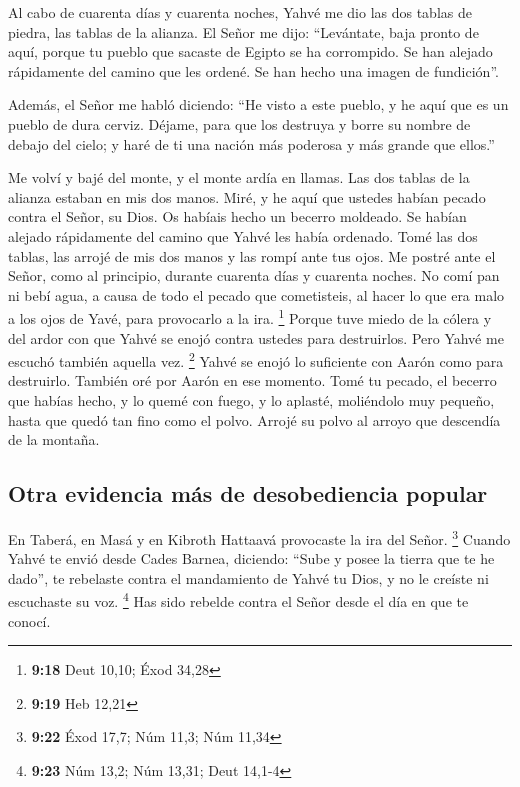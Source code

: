  Al cabo de cuarenta días y cuarenta noches, Yahvé me dio
las dos tablas de piedra, las tablas de la alianza.  El
Señor me dijo: ``Levántate, baja pronto de aquí, porque tu pueblo que
sacaste de Egipto se ha corrompido. Se han alejado rápidamente del
camino que les ordené. Se han hecho una imagen de fundición''.

 Además, el Señor me habló diciendo: ``He visto a este
pueblo, y he aquí que es un pueblo de dura cerviz. 
Déjame, para que los destruya y borre su nombre de debajo del cielo; y
haré de ti una nación más poderosa y más grande que ellos.''

 Me volví y bajé del monte, y el monte ardía en llamas.
Las dos tablas de la alianza estaban en mis dos manos. 
Miré, y he aquí que ustedes habían pecado contra el Señor, su Dios. Os
habíais hecho un becerro moldeado. Se habían alejado rápidamente del
camino que Yahvé les había ordenado.  Tomé las dos
tablas, las arrojé de mis dos manos y las rompí ante tus ojos.
 Me postré ante el Señor, como al principio, durante
cuarenta días y cuarenta noches. No comí pan ni bebí agua, a causa de
todo el pecado que cometisteis, al hacer lo que era malo a los ojos de
Yavé, para provocarlo a la ira. \footnote{\textbf{9:18} Deut 10,10; Éxod
  34,28}  Porque tuve miedo de la cólera y del ardor con
que Yahvé se enojó contra ustedes para destruirlos. Pero Yahvé me
escuchó también aquella vez. \footnote{\textbf{9:19} Heb 12,21}
 Yahvé se enojó lo suficiente con Aarón como para
destruirlo. También oré por Aarón en ese momento.  Tomé
tu pecado, el becerro que habías hecho, y lo quemé con fuego, y lo
aplasté, moliéndolo muy pequeño, hasta que quedó tan fino como el polvo.
Arrojé su polvo al arroyo que descendía de la montaña.

\hypertarget{otra-evidencia-muxe1s-de-desobediencia-popular}{%
\subsection{Otra evidencia más de desobediencia
popular}\label{otra-evidencia-muxe1s-de-desobediencia-popular}}

 En Taberá, en Masá y en Kibroth Hattaavá provocaste la
ira del Señor. \footnote{\textbf{9:22} Éxod 17,7; Núm 11,3; Núm 11,34}
 Cuando Yahvé te envió desde Cades Barnea, diciendo:
``Sube y posee la tierra que te he dado'', te rebelaste contra el
mandamiento de Yahvé tu Dios, y no le creíste ni escuchaste su voz.
\footnote{\textbf{9:23} Núm 13,2; Núm 13,31; Deut 14,1-4}
 Has sido rebelde contra el Señor desde el día en que te
conocí.


